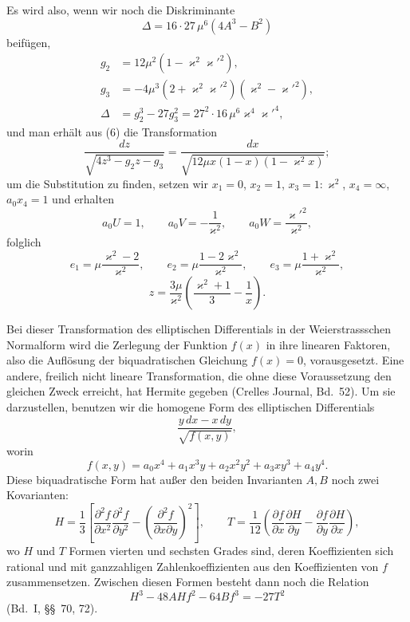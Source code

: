 \documentclass[11pt]{article}
\begin{document}
Es wird also, wenn wir noch die Diskriminante
\[
\Delta=16\cdot 27\,\mu^6(4A^3-B^2)
\]
beifügen,
\begin{equation}
\begin{aligned}
g_2&=12\mu^2(1-\varkappa^2\varkappa'^2),\\
g_3&=-4\mu^3(2+\varkappa^2\varkappa'^2)(\varkappa^2-\varkappa'^2),\\
\Delta&=g_2^3-27g_3^2=27^2\cdot16\,\mu^6\varkappa^4\varkappa'^4,
\end{aligned}
\tag{9}
\end{equation}
und man erhält aus (6) die Transformation
\begin{equation}
\frac{dz}{\sqrt{4z^3-g_2z-g_3}}=
\frac{dx}{\sqrt{12\mu x(1-x)(1-\varkappa^2x)}};
\tag{10}
\end{equation}
um die Substitution zu finden, setzen wir $x_1=0$, $x_2=1$, $x_3=1:\varkappa^2$, $x_4=\infty$, $a_0x_4=1$ und erhalten
\[
a_0U=1,\qquad a_0V=-\frac1{\varkappa^2},\qquad a_0W=\frac{\varkappa'^2}{\varkappa^2},
\]
folglich
\[
e_1=\mu\frac{\varkappa^2-2}{\varkappa^2},\qquad
 e_2=\mu\frac{1-2\varkappa^2}{\varkappa^2},\qquad
 e_3=\mu\frac{1+\varkappa^2}{\varkappa^2},
\]
\begin{equation}
z=\frac{3\mu}{\varkappa^2}\left(\frac{\varkappa^2+1}{3}-\frac1x\right).
\tag{11}
\end{equation}

Bei dieser Transformation des elliptischen Differentials in der Weierstrassschen Normalform wird die Zerlegung der Funktion $f(x)$ in ihre linearen Faktoren, also die Auflösung der biquadratischen Gleichung $f(x)=0$, vorausgesetzt. Eine andere, freilich nicht lineare Transformation, die ohne diese Voraussetzung den gleichen Zweck erreicht, hat Hermite gegeben (Crelles Journal, Bd.~52). Um sie darzustellen, benutzen wir die homogene Form des elliptischen Differentials
\begin{equation}
\frac{y\,dx-x\,dy}{\sqrt{f(x,y)}},
\tag{12}
\end{equation}
worin
\begin{equation}
f(x,y)=a_0x^4+a_1x^3y+a_2x^2y^2+a_3xy^3+a_4y^4.
\tag{13}
\end{equation}
Diese biquadratische Form hat außer den beiden Invarianten $A,B$ noch zwei Kovarianten:
\begin{equation}
H=\frac13\left[\frac{\partial^2 f}{\partial x^2}\frac{\partial^2 f}{\partial y^2}-\left(\frac{\partial^2 f}{\partial x\partial y}\right)^2\right],\qquad
T=\frac1{12}\left(\frac{\partial f}{\partial x}\frac{\partial H}{\partial y}-\frac{\partial f}{\partial y}\frac{\partial H}{\partial x}\right),
\tag{14}
\end{equation}
wo $H$ und $T$ Formen vierten und sechsten Grades sind, deren Koeffizienten sich rational und mit ganzzahligen Zahlenkoeffizienten aus den Koeffizienten von $f$ zusammensetzen. Zwischen diesen Formen besteht dann noch die Relation
\begin{equation}
H^3-48AHf^2-64Bf^3=-27T^2
\tag{15}
\end{equation}
(Bd.~I, \S\S~70, 72).
\end{document}
